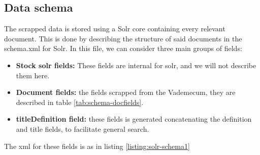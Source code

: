 


\subsection{Data schema}
\label{subsec:solrschema}

The scrapped data is stored using a Solr core containing every relevant document. This is done by describing the structure of said documents in the schema.xml for Solr. In this file, we can consider three main groups of fields:

\begin{itemize}
 \item \textbf{Stock solr fields: } These fields are internal for solr, and we will not describe them here.
 \item \textbf{Document fields: } the fields scrapped from the Vademecum, they are described in table \ref{tab:schema-docfields}.
 \item \textbf{titleDefinition field: } these fields is generated concatenating the definition and title fields, to facilitate general search. %
\end{itemize}

The xml for these fields is as in listing \ref{listing:solr-schema1}
\begin{center}
  
\end{center}

